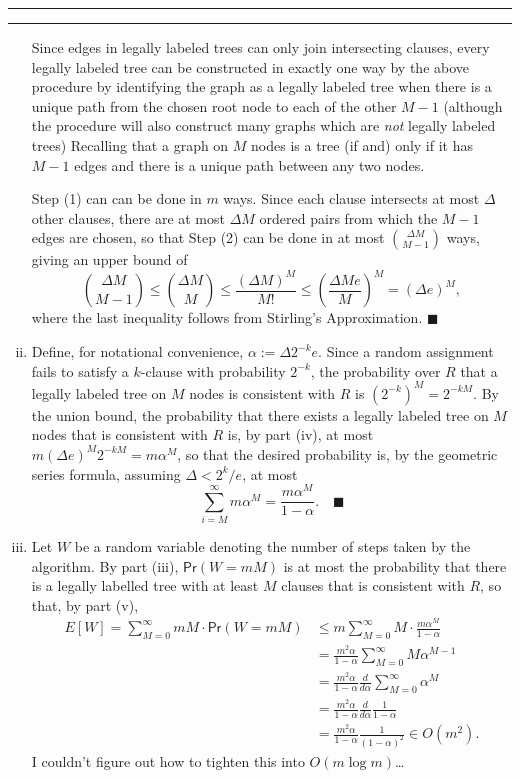 \documentclass[11pt]{article}
\newcounter{questionCounter}
\newcounter{partCounter}[questionCounter]
\newenvironment{question}[2][\arabic{questionCounter}]{%
    \setcounter{partCounter}{0}%
    \vspace{.25in} \hrule \vspace{0.5em}%
        \noindent{\bf #2}%
    \vspace{0.8em} \hrule \vspace{.10in}%
    \addtocounter{questionCounter}{1}%
}{}
\renewcommand{\qed}{\quad $\blacksquare$}
\newcommand{\mqed}{\quad \blacksquare}
\newcommand{\pr}[1]{\mathsf{Pr}\left( #1 \right)} %
\begin{document}
\begin{question}{Problem 3}
\begin{enumerate}[(i)]
Since edges in legally labeled trees can only join intersecting clauses, every
legally labeled tree can be constructed in exactly one way by the above
procedure by identifying the graph as a legally labeled tree when there is a
unique path from the chosen root node to each of the other $M - 1$ (although
the procedure will also construct many graphs which are \emph{not} legally
labeled trees) Recalling that a graph on $M$ nodes is a tree (if and) only if
it has $M - 1$ edges and there is a unique path between any two nodes.

Step (1) can can be done in $m$ ways. Since each clause intersects at most
$\Delta$ other clauses, there are at most $\Delta M$ ordered pairs from which
the $M - 1$ edges are chosen, so that Step (2) can be done in at most
${\Delta M \choose M - 1}$ ways, giving an upper bound of
\[{\Delta M \choose M - 1}
    \leq {\Delta M \choose M}
    \leq \frac{(\Delta M)^M}{M!}
    \leq \left( \frac{\Delta Me}{M} \right)^M
    =    (\Delta e)^M,
\]
where the last inequality follows from Stirling's Approximation. \qed

\item Define, for notational convenience, $\alpha := \Delta 2^{-k} e$. Since a
random assignment fails to satisfy a $k$-clause with probability $2^{-k}$, the
probability over $R$ that a legally labeled tree on $M$ nodes is consistent
with $R$ is $\left( 2^{-k} \right)^M = 2^{-kM}$. By the union bound, the
probability that there exists a legally labeled tree on $M$ nodes that is
consistent with $R$ is, by part (iv), at most
$m(\Delta e)^M 2^{-kM} = m\alpha^M$, so that the desired probability is, by the
geometric series formula, assuming $\Delta < 2^k/e$, at most
\[\sum_{i = M}^{\infty} m \alpha^M
    = \frac{m \alpha^M}{1 - \alpha}. \mqed
\]

\item Let $W$ be a random variable denoting the number of steps taken by the
algorithm. By part (iii), $\pr{W = mM}$ is at most the probability that there
is a legally labelled tree with at least $M$ clauses that is consistent with
$R$, so that, by part (v),
\begin{align*}
E[W]
    = \sum_{M = 0}^{\infty} mM \cdot \pr{W = mM}
 &  \leq m\sum_{M = 0}^{\infty} M \cdot \frac{m \alpha^M}{1 - \alpha}       \\
 &  = \frac{m^2\alpha}{1 - \alpha} \sum_{M = 0}^{\infty} M \alpha^{M - 1}   \\
 &  = \frac{m^2\alpha}{1 - \alpha} \frac{d}{d\alpha}
                                        \sum_{M = 0}^{\infty} \alpha^M      \\
 &  = \frac{m^2\alpha}{1 - \alpha} \frac{d}{d\alpha} \frac{1}{1 - \alpha}   \\
 &  = \frac{m^2\alpha}{1 - \alpha} \frac{1}{(1 - \alpha)^2}
    \in O(m^2).
\end{align*}
I couldn't figure out how to tighten this into $O(m \log m)$\dots
\end{enumerate}
\end{question}
\end{document}
